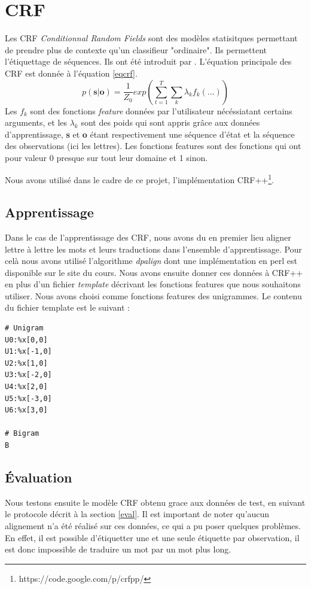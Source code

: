 \documentclass{article}
\begin{document}
\section{CRF}
Les CRF \emph{Conditionnal Random Fields} sont des modèles statisitques permettant de prendre plus de contexte qu'un classifieur "ordinaire". Ils permettent l'étiquettage de séquences. Ils ont été introduit par \cite{Lafferty01}. L'équation principale des CRF est donnée à l'équation \ref{eqcrf}.
\begin{equation}
p(\textbf{s}|\textbf{o}) = \frac{1}{Z_0}exp(\sum_{t=1}^T\sum_k \lambda_k f_k(...))
\label{eqcrf}
\end{equation}
Les $f_k$ sont des fonctions \emph{feature} données par l'utilisateur nécéssiatant certains arguments, et les $\lambda_k$ sont des poids qui sont appris grâce aux données d'apprentissage, \textbf{s} et \textbf{o} étant respectivement une séquence d'état et la séquence des observations (ici les lettres). Les fonctions features sont des fonctions qui ont pour valeur 0 presque sur tout leur domaine et 1 sinon.

Nous avons utilisé dans le cadre de ce projet, l'implémentation CRF++\footnote{https://code.google.com/p/crfpp/}.

\subsection{Apprentissage}
Dans le cas de l'apprentissage des CRF, nous avons du en premier lieu aligner lettre à lettre les mots et leurs traductions dans l'ensemble d'apprentissage. Pour celà nous avons utilisé l'algorithme \emph{dpalign} dont une implémentation en perl est disponible sur le site du cours. Nous avons ensuite donner ces données à CRF++ en plus d'un fichier \emph{template} décrivant les fonctions features que nous souhaitons utiliser. Nous avons choisi comme fonctions features des unigrammes. Le contenu du fichier template est le suivant :
\begin{verbatim}
# Unigram
U0:%x[0,0]
U1:%x[-1,0]
U2:%x[1,0]
U3:%x[-2,0]
U4:%x[2,0]
U5:%x[-3,0]
U6:%x[3,0]

# Bigram
B
\end{verbatim}

\subsection{Évaluation}
Nous testons ensuite le modèle CRF obtenu grace aux données de test, en suivant le protocole décrit à la section \ref{eval}. Il est important de noter qu'aucun alignement n'a été réalisé sur ces données, ce qui a pu poser quelques problèmes. En effet, il est possible d'étiquetter une et une seule étiquette par observation, il est donc impossible de traduire un mot par un mot plus long.
\end{document}
